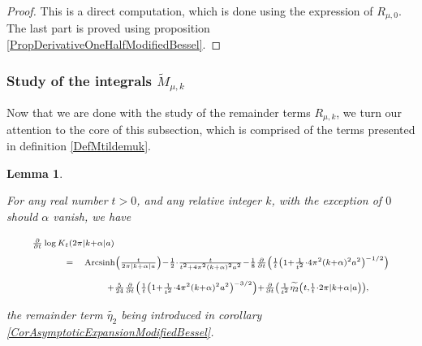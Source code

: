 \documentclass{jams-l}
\newtheorem{lemma}[theorem]{Lemma}
\theoremstyle{definition}
\theoremstyle{remark}
\numberwithin{equation}{section}
\DeclareMathOperator{\arcsinh}{Arcsinh}
\begin{document}
            \begin{proof}
            
                This is a direct computation, which is done using the expression of $R_{\mu,0}$. The last part is proved using proposition \ref{PropDerivativeOneHalfModifiedBessel}.
            
            \end{proof}
            
            
        \subsubsection{Study of the integrals $\widetilde{M}_{\mu,k}$}
        \label{SubSubSecStudyMTildemuk}
        
            Now that we are done with the study of the remainder terms $R_{\mu,k}$, we turn our attention to the core of this subsection, which is comprised of the terms presented in definition \ref{DefMtildemuk}.
            
            \begin{lemma}
            \label{LemLogDerivativeModifiedBessel}
            
                For any real number $t > 0$, and any relative integer $k$, with the exception of $0$ should $\alpha$ vanish, we have
                
                \[ \begin{array}{lll}
                        \multicolumn{3}{l}{\scriptstyle \frac{\partial}{\partial t} \log K_t \left( 2 \pi \left \vert k + \alpha \right \vert a \right)} \\[0.5em] 
                        
                        \qquad & \scriptstyle = & \scriptstyle \arcsinh \left( \frac{t}{2 \pi \left \vert k + \alpha \right \vert a} \right) - \frac{1}{2} \cdot \frac{t}{t^2 + 4 \pi^2 \left( k + \alpha \right)^2 a^2} - \frac{1}{8} \frac{\partial}{\partial t} \left( \frac{1}{t} \left( 1 + \frac{1}{t^2} \cdot 4 \pi^2 \left( k + \alpha \right)^2 a^2 \right)^{-1/2} \right) \\[1em]
                        
                        && \qquad \scriptstyle + \frac{5}{24} \frac{\partial}{\partial t} \left( \frac{1}{t} \left( 1 + \frac{1}{t^2} \cdot 4 \pi^2 \left( k + \alpha \right)^2 a^2 \right)^{-3/2} \right) + \frac{\partial}{\partial t} \left( \frac{1}{t^2} \widetilde{\eta_2} \left( t, \frac{1}{t} \cdot 2 \pi \left \vert k + \alpha \right \vert a \right) \right),
                    \end{array} \]
                
                \noindent the remainder term $\widetilde{\eta_2}$ being introduced in corollary \ref{CorAsymptoticExpansionModifiedBessel}.
            
            \end{lemma}
            
\end{document}
